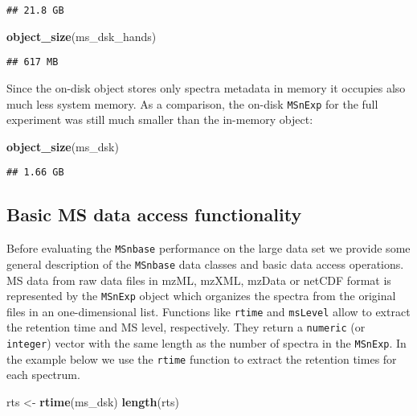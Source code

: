 \documentclass[journal=jacsat,manuscript=suppinfo]{achemso}
\newenvironment{Shaded}{\begin{snugshade}}{\end{snugshade}}
\newcommand{\KeywordTok}[1]{\textcolor[rgb]{0.13,0.29,0.53}{\textbf{#1}}}
\newcommand{\NormalTok}[1]{#1}
\newcommand{\StringTok}[1]{\textcolor[rgb]{0.31,0.60,0.02}{#1}}
\begin{document}
\begin{verbatim}
## 21.8 GB
\end{verbatim}

\begin{Shaded}
\begin{Highlighting}[]
\KeywordTok{object\_size}\NormalTok{(ms\_dsk\_hands)}
\end{Highlighting}
\end{Shaded}

\begin{verbatim}
## 617 MB
\end{verbatim}

Since the on-disk object stores only spectra metadata in memory it
occupies also much less system memory. As a comparison, the on-disk
\texttt{MSnExp} for the full experiment was still much smaller than the
in-memory object:

\begin{Shaded}
\begin{Highlighting}[]
\KeywordTok{object\_size}\NormalTok{(ms\_dsk)}
\end{Highlighting}
\end{Shaded}

\begin{verbatim}
## 1.66 GB
\end{verbatim}

\hypertarget{basic-ms-data-access-functionality}{%
\subsection{Basic MS data access
functionality}\label{basic-ms-data-access-functionality}}

Before evaluating the \texttt{MSnbase} performance on the large data set
we provide some general description of the \texttt{MSnbase} data classes
and basic data access operations. MS data from raw data files in mzML,
mzXML, mzData or netCDF format is represented by the \texttt{MSnExp}
object which organizes the spectra from the original files in an
one-dimensional list. Functions like \texttt{rtime} and \texttt{msLevel}
allow to extract the retention time and MS level, respectively. They
return a \texttt{numeric} (or \texttt{integer}) vector with the same
length as the number of spectra in the \texttt{MSnExp}. In the example
below we use the \texttt{rtime} function to extract the retention times
for each spectrum.

\begin{Shaded}
\begin{Highlighting}[]
\NormalTok{rts \textless{}{-}}\StringTok{ }\KeywordTok{rtime}\NormalTok{(ms\_dsk)}
\KeywordTok{length}\NormalTok{(rts)}
\end{Highlighting}
\end{Shaded}
\end{document}
